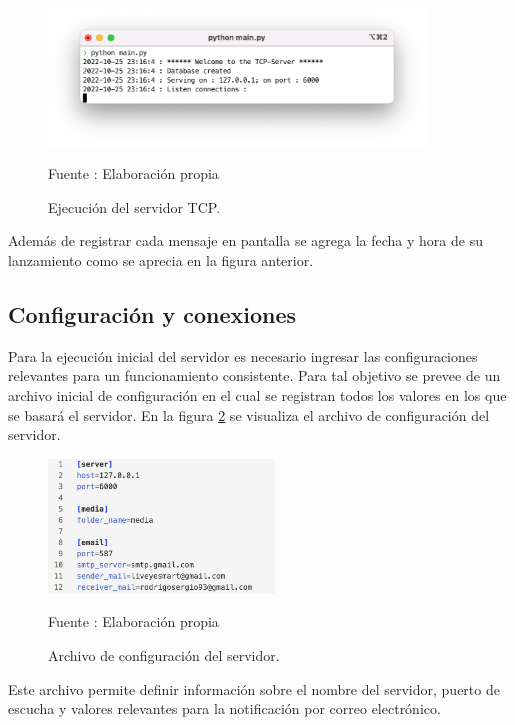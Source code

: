 \begin{figure}[H]
    \begin{center}
        \includegraphics[width=10cm]{img/capitulo_5/tcp_server.png}
        \caption{Ejecución del servidor TCP.}
        Fuente : Elaboración propia
        \label{fig:servertcp_console}
    \end{center}
\end{figure}
Además de registrar cada mensaje en pantalla se agrega la fecha y hora de su lanzamiento como se aprecia en la figura anterior.
\subsection{Configuración y conexiones}
Para la ejecución inicial del servidor es necesario ingresar las configuraciones relevantes para un funcionamiento consistente. Para tal objetivo se prevee de un archivo inicial de configuración en el cual se registran todos los valores en los que se basará el servidor. En la figura \ref{fig:config_file} se visualiza el archivo de configuración del servidor.

\begin{figure}[H]
    \begin{center}
        \includegraphics[width=6cm]{img/capitulo_5/config.ini.png}
    \end{center}
    \begin{center}
        \caption{Archivo de configuración del servidor.}
        Fuente : Elaboración propia
        \label{fig:config_file}
    \end{center}
\end{figure}

Este archivo permite definir información sobre el nombre del servidor, puerto de escucha y valores relevantes para la notificación por correo electrónico.\\

